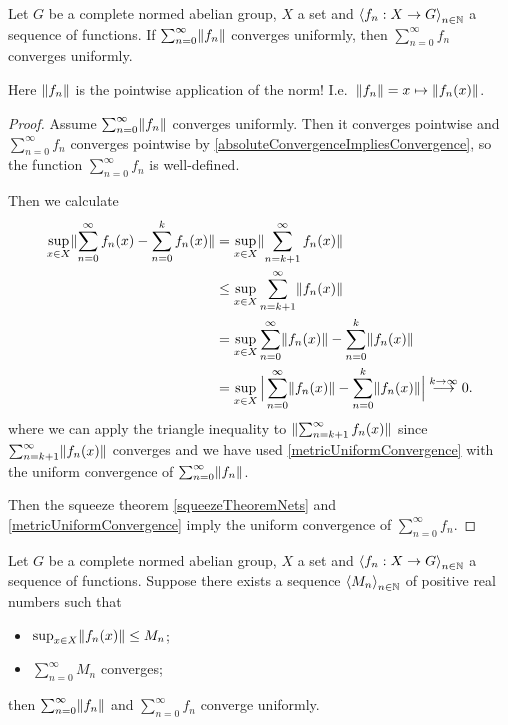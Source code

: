 \begin{lemma}
Let $G$ be a complete normed abelian group, $X$ a set and $\left\langle f_n: X\to G \right\rangle_{n\in\mathbb{N}}$ a sequence of functions. If $\sum_{n=0}^\infty \lVert f_n\rVert$ converges uniformly, then $\sum_{n=0}^\infty f_n$ converges uniformly.
\end{lemma}
Here $\lVert f_n\rVert$ is the pointwise application of the norm! I.e.\ $\lVert f_n\rVert = x\mapsto \lVert f_n(x)\rVert$.
\begin{proof}
Assume $\sum_{n=0}^\infty \lVert f_n\rVert$ converges uniformly. Then it converges pointwise and $\sum_{n=0}^\infty f_n$ converges pointwise by \ref{absoluteConvergenceImpliesConvergence}, so the function $\sum_{n=0}^\infty f_n$ is well-defined.

Then we calculate
\begin{align*}
\sup_{x\in X}\lVert\sum_{n=0}^\infty f_n(x) - \sum_{n=0}^k f_n(x)\rVert &= \sup_{x\in X}\lVert\sum_{n=k+1}^\infty f_n(x)\rVert \\
&\leq \sup_{x\in X}\sum_{n=k+1}^\infty \lVert f_n(x)\rVert \\
&= \sup_{x\in X}\sum_{n=0}^\infty \lVert f_n(x)\rVert - \sum_{n=0}^k \lVert f_n(x)\rVert \\
&= \sup_{x\in X}\Big|\sum_{n=0}^\infty \lVert f_n(x)\rVert - \sum_{n=0}^k \lVert f_n(x)\rVert\Big| \overset{k\to \infty}{\longrightarrow} 0.
\end{align*}
where we can apply the triangle inequality to $\lVert\sum_{n=k+1}^\infty f_n(x)\rVert$ since $\sum_{n=k+1}^\infty \lVert f_n(x)\rVert$ converges and we have used \ref{metricUniformConvergence} with the uniform convergence of $\sum_{n=0}^\infty \lVert f_n\rVert$.

Then the squeeze theorem \ref{squeezeTheoremNets} and \ref{metricUniformConvergence} imply the uniform convergence of $\sum_{n=0}^\infty f_n$.
\end{proof}
\begin{corollary} \label{WeierstrassMTest}
Let $G$ be a complete normed abelian group, $X$ a set and $\left\langle f_n: X\to G \right\rangle_{n\in\mathbb{N}}$ a sequence of functions. Suppose there exists a sequence $\left\langle M_n \right\rangle_{n\in\mathbb{N}}$ of positive real numbers such that
\begin{itemize}
\item $\sup_{x\in X}\lVert f_n(x)\rVert \leq M_n$;
\item $\sum_{n=0}^\infty M_n$ converges;
\end{itemize}
then $\sum_{n=0}^\infty \lVert f_n\rVert$ and $\sum_{n=0}^\infty f_n$ converge uniformly.
\end{corollary}

